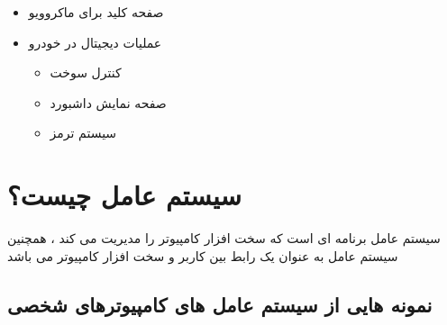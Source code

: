 \documentclass[12pt]{book}
\begin{document}
\begin{itemize}
	\item صفحه کلید برای ماکروویو
	\item عملیات دیجیتال در خودرو
	\begin{itemize}
		\item کنترل سوخت
		\item صفحه نمایش داشبورد
		\item سیستم ترمز
	\end{itemize}
\end{itemize}


\section{سیستم عامل چیست؟}

سیستم عامل برنامه ای است که سخت افزار کامپیوتر را مدیریت می کند ، همچنین سیستم عامل به عنوان یک رابط بین کاربر و سخت افزار کامپیوتر می باشد 

\subsection{نمونه هایی از سیستم عامل های کامپیوترهای شخصی}
\end{document}
